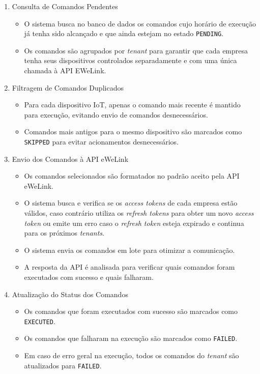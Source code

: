 \begin{enumerate}
  \item Consulta de Comandos Pendentes
  \begin{itemize}
      \item O sistema busca no banco de dados os comandos cujo horário de execução já tenha sido alcançado e que ainda estejam no estado \texttt{PENDING}.
      \item Os comandos são agrupados por \textit{tenant} para garantir que cada empresa tenha seus dispositivos controlados separadamente e com uma única chamada à API EWeLink.
  \end{itemize}
  
  \item Filtragem de Comandos Duplicados
  \begin{itemize}
      \item Para cada dispositivo IoT, apenas o comando mais recente é mantido para execução, evitando envio de comandos desnecessários.
      \item Comandos mais antigos para o mesmo dispositivo são marcados como \texttt{SKIPPED} para evitar acionamentos desnecessários.
  \end{itemize}
  
  \item Envio dos Comandos à API eWeLink
  \begin{itemize}
      \item Os comandos selecionados são formatados no padrão aceito pela API eWeLink.
      \item O sistema busca e verifica se os \textit{access tokens} de cada empresa estão válidos, caso contrário utiliza os \textit{refresh tokens} para obter um novo \textit{access token} ou emite um erro caso o \textit{refresh token} esteja expirado e continua para os próximos \textit{tenants}.
      \item O sistema envia os comandos em lote para otimizar a comunicação.
      \item A resposta da API é analisada para verificar quais comandos foram executados com sucesso e quais falharam.
  \end{itemize}
  
  \item Atualização do Status dos Comandos
  \begin{itemize}
      \item Os comandos que foram executados com sucesso são marcados como \texttt{EXECUTED}.
      \item Os comandos que falharam na execução são marcados como \texttt{FAILED}.
      \item Em caso de erro geral na execução, todos os comandos do \textit{tenant} são atualizados para \texttt{FAILED}.
  \end{itemize}
\end{enumerate}

